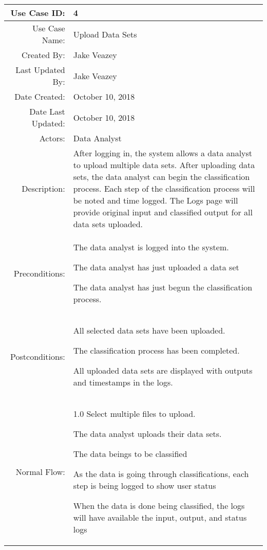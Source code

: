 \documentclass[12pt,oneside,letterpaper]{article}
\newenvironment{packed_enumerate}{ %
\vspace{-7mm}
\begin{enumerate}
  \setlength{\itemsep}{0pt}
  \setlength{\parskip}{0pt}
  \setlength{\parsep}{0pt}
}{\end{enumerate}
\vspace{-8mm}}
\begin{document}
\begin{longtable}{|r|p{3.8in}|}
\hline
Use Case ID:&4\\
\hline
Use Case Name:&Upload Data Sets\\
\hline
Created By:&Jake Veazey\\
\hline
Last Updated By:&Jake Veazey\\
\hline
Date Created:&October 10, 2018\\
\hline
Date Last Updated:&October 10, 2018\\
\hline
Actors:&Data Analyst\\
\hline
Description:&After logging in, the system allows a data analyst to upload multiple data sets. After uploading data sets, the data analyst can begin the classification process. Each step of the classification process will be noted and time logged. The Logs page will provide original input and classified output for all data sets uploaded.\\
\hline
Preconditions:&\begin{packed_enumerate}
\item The data analyst is logged into the system.
\item The data analyst has just uploaded a data set
\item The data analyst has just begun the classification process.
\end{packed_enumerate}\\
\hline
Postconditions:&\begin{packed_enumerate}
\item All selected data sets have been uploaded.
\item The classification process has been completed.
\item All uploaded data sets are displayed with outputs and timestamps in the logs.
\end{packed_enumerate}\\
\hline
Normal Flow:&1.0 Select multiple files to upload.\newline
\begin{packed_enumerate}
\item The data analyst uploads their data sets.
\item The data beings to be classified
\item As the data is going through classifications, each step is being logged to show user status
\item When the data is done being classified, the logs will have available the input, output, and status logs
\end{packed_enumerate}\\

\end{longtable}
\end{document}

